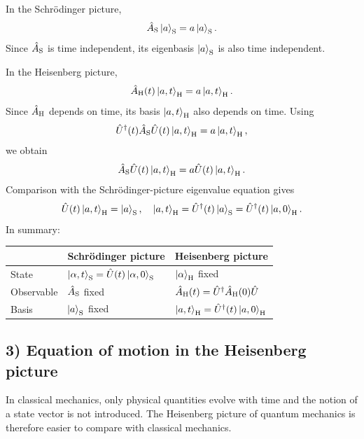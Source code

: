 In the Schr\"odinger picture,
\begin{equation}
\hat{A}_{\mathrm S}\left|a\right\rangle_{\mathrm S}=a\left|a\right\rangle_{\mathrm S}.
\end{equation}
Since $\hat{A}_{\mathrm S}$ is time independent, its eigenbasis $\left|a\right\rangle_{\mathrm S}$ is also time independent.

In the Heisenberg picture,
\begin{equation}
\hat{A}_{\mathrm H}(t)\left|a,t\right\rangle_{\mathrm H}=a\left|a,t\right\rangle_{\mathrm H}.
\end{equation}
Since $\hat{A}_{\mathrm H}$ depends on time, its basis $\left|a,t\right\rangle_{\mathrm H}$ also depends on time. Using
\begin{equation}
\hat{U}^{\dagger}(t)\hat{A}_{\mathrm S}\hat{U}(t)\left|a,t\right\rangle_{\mathrm H}
=a\left|a,t\right\rangle_{\mathrm H},
\end{equation}
we obtain
\begin{equation}
\hat{A}_{\mathrm S}\hat{U}(t)\left|a,t\right\rangle_{\mathrm H}
=a\hat{U}(t)\left|a,t\right\rangle_{\mathrm H}.
\end{equation}
Comparison with the Schr\"odinger-picture eigenvalue equation gives
\begin{equation}
\hat{U}(t)\left|a,t\right\rangle_{\mathrm H}=\left|a\right\rangle_{\mathrm S},\quad
\left|a,t\right\rangle_{\mathrm H}=\hat{U}^{\dagger}(t)\left|a\right\rangle_{\mathrm S}
=\hat{U}^{\dagger}(t)\left|a,0\right\rangle_{\mathrm H}.
\end{equation}
In summary:
\begin{center}\small
\begin{tabular}{@{}lll@{}}\toprule
&Schr\"odinger picture&Heisenberg picture\\\midrule
State&$\left|\alpha,t\right\rangle_{\mathrm S}=\hat{U}(t)\left|\alpha,0\right\rangle_{\mathrm S}$&$\left|\alpha\right\rangle_{\mathrm H}$ fixed\\
Observable&$\hat{A}_{\mathrm S}$ fixed&$\hat{A}_{\mathrm H}(t)=\hat{U}^{\dagger}\hat{A}_{\mathrm H}(0)\hat{U}$\\
Basis&$\left|a\right\rangle_{\mathrm S}$ fixed&$\left|a,t\right\rangle_{\mathrm H}=\hat{U}^{\dagger}(t)\left|a,0\right\rangle_{\mathrm H}$\\\bottomrule
\end{tabular}\end{center}

\subsection*{3) Equation of motion in the Heisenberg picture}
In classical mechanics, only physical quantities evolve with time and the notion of a state vector is not introduced. The Heisenberg picture of quantum mechanics is therefore easier to compare with classical mechanics.

